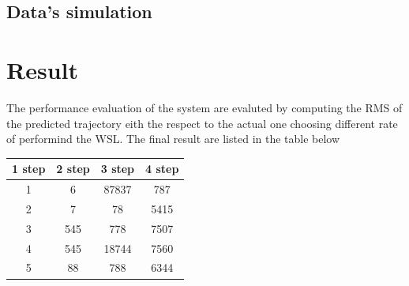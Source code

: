 \documentclass{article}
\begin{document}
\begin{multicols}{2}
    \subsection*{Data's simulation}

    \section*{Result}
    The performance evaluation of the system are evaluted by computing the RMS of the predicted trajectory eith the respect to the actual one 
    choosing different rate of performind the WSL. The final result are listed in the table below
    

\begin{center}
    \begin{tabular}{||c c c c||} 
    \hline
    1 step & 2 step & 3 step & 4 step \\ [0.5ex] 
    \hline\hline
    1 & 6 & 87837 & 787 \\ 
    \hline
    2 & 7 & 78 & 5415 \\
    \hline
    3 & 545 & 778 & 7507 \\
    \hline
    4 & 545 & 18744 & 7560 \\
    \hline
    5 & 88 & 788 & 6344 \\ [1ex] 
    \hline
   \end{tabular}
   \end{center}
   
   
    \subsection*{}
\end{multicols}
\end{document}
